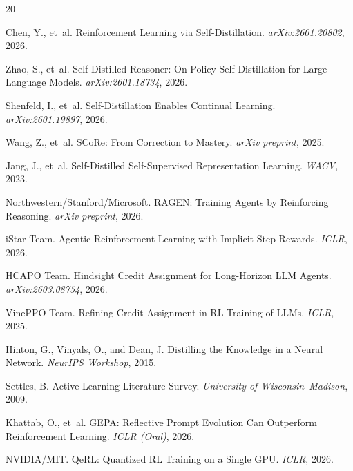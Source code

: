 \documentclass[11pt]{article}
\begin{document}
\begin{thebibliography}{20}

Chen, Y., et~al.
\newblock Reinforcement Learning via Self-Distillation.
\newblock \emph{arXiv:2601.20802}, 2026.

Zhao, S., et~al.
\newblock Self-Distilled Reasoner: On-Policy Self-Distillation for Large Language Models.
\newblock \emph{arXiv:2601.18734}, 2026.

Shenfeld, I., et~al.
\newblock Self-Distillation Enables Continual Learning.
\newblock \emph{arXiv:2601.19897}, 2026.

Wang, Z., et~al.
\newblock SCoRe: From Correction to Mastery.
\newblock \emph{arXiv preprint}, 2025.

Jang, J., et~al.
\newblock Self-Distilled Self-Supervised Representation Learning.
\newblock \emph{WACV}, 2023.

Northwestern/Stanford/Microsoft.
\newblock RAGEN: Training Agents by Reinforcing Reasoning.
\newblock \emph{arXiv preprint}, 2026.

iStar Team.
\newblock Agentic Reinforcement Learning with Implicit Step Rewards.
\newblock \emph{ICLR}, 2026.

HCAPO Team.
\newblock Hindsight Credit Assignment for Long-Horizon LLM Agents.
\newblock \emph{arXiv:2603.08754}, 2026.

VinePPO Team.
\newblock Refining Credit Assignment in RL Training of LLMs.
\newblock \emph{ICLR}, 2025.

Hinton, G., Vinyals, O., and Dean, J.
\newblock Distilling the Knowledge in a Neural Network.
\newblock \emph{NeurIPS Workshop}, 2015.

Settles, B.
\newblock Active Learning Literature Survey.
\newblock \emph{University of Wisconsin--Madison}, 2009.

Khattab, O., et~al.
\newblock GEPA: Reflective Prompt Evolution Can Outperform Reinforcement Learning.
\newblock \emph{ICLR (Oral)}, 2026.

NVIDIA/MIT.
\newblock QeRL: Quantized RL Training on a Single GPU.
\newblock \emph{ICLR}, 2026.


\end{thebibliography}
\end{document}
